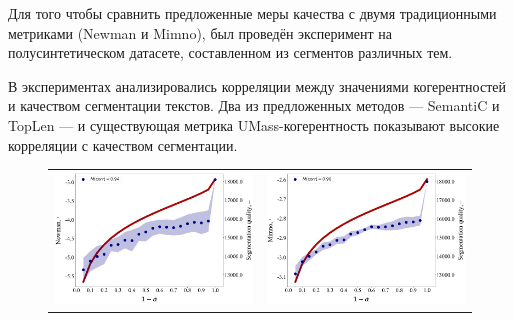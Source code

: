 Для того чтобы сравнить предложенные меры качества с двумя традиционными метриками (Newman и Mimno), был проведён эксперимент на полусинтетическом датасете, составленном из сегментов различных тем.

В экспериментах анализировались корреляции между значениями когерентностей и качеством сегментации текстов. Два из предложенных методов --- SemantiC и TopLen --- и существующая метрика UMass-когерентность показывают высокие корреляции с качеством сегментации.

\begin{figure}
\begin{tabular}{cc}
    \includegraphics[width=70mm]{images/segm_mimno.png} &   \includegraphics[width=70mm]{images/segm_newman.png} \\
 

\end{tabular}
\end{figure}
